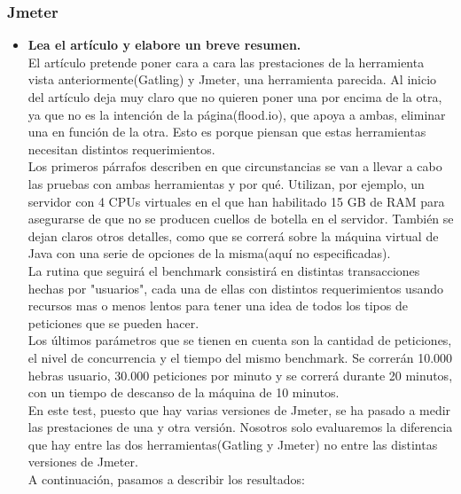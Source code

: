 \subsubsection{Jmeter}
\begin{itemize}
	\item \textbf{Lea el artículo y elabore un breve resumen\cite{benchmarkingJmGt}.}\\
	El artículo pretende poner cara a cara las prestaciones de la herramienta vista anteriormente(Gatling) y Jmeter, una herramienta parecida. Al inicio del artículo deja muy claro que no quieren poner una por encima de la otra, ya que no es la intención de la página(flood.io), que apoya a ambas, eliminar una en función de la otra. Esto es porque piensan que estas herramientas necesitan distintos requerimientos.\\
	
	Los primeros párrafos describen en que circunstancias se van a llevar a cabo las pruebas con ambas herramientas y por qué. Utilizan, por ejemplo, un servidor con 4 CPUs virtuales en el que han habilitado 15 GB de RAM para asegurarse de que no se producen cuellos de botella en el servidor. También se dejan claros otros detalles, como que se correrá sobre la máquina virtual de Java con una serie de opciones de la misma(aquí no especificadas).\\
	
	La rutina que seguirá el benchmark consistirá en distintas transacciones hechas por "usuarios", cada una de ellas con distintos requerimientos usando recursos mas o menos lentos para tener una idea de todos los tipos de peticiones que se pueden hacer. \\
	
	Los últimos parámetros que se tienen en cuenta son la cantidad de peticiones, el nivel de concurrencia y el tiempo del mismo benchmark. Se correrán 10.000 hebras usuario, 30.000 peticiones por minuto y se correrá durante 20 minutos, con un tiempo de descanso de la máquina de 10 minutos.\\
	
	En este test, puesto que hay varias versiones de Jmeter, se ha pasado a medir las prestaciones de una y otra versión. Nosotros solo evaluaremos la diferencia que hay entre las dos herramientas(Gatling y Jmeter) no entre las distintas versiones de Jmeter.\\
	
	A continuación, pasamos a describir los resultados:\\
	

\end{itemize}

